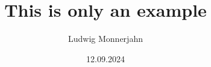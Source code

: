 \documentclass[a4paper]{report}
\author{Ludwig Monnerjahn}
\date{12.09.2024}
\title{This is only an example}
\begin{document}
\maketitle


\clearpage
\tableofcontents

\clearpage

\clearpage






\nocite{*}
\end{document}
